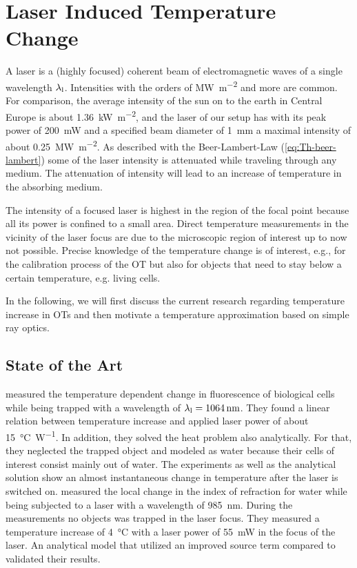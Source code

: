 \section{Laser Induced Temperature Change\label{sec:Th-temperature}}

A laser is a (highly focused) coherent beam of electromagnetic waves of a 
single wavelength $\lambda_{\mathrm{l}}$. Intensities with the orders of 
\si{\mega\watt\per\square\meter} and more are common. For comparison, the 
average intensity of the sun on to the earth in Central Europe is about 
\SI{1.36}{\kilo\watt\per\square\meter}, and the laser of our setup has with its 
peak power of \SI{200}{\milli\watt} and a specified beam diameter of 
\SI{1}{\mm} a maximal intensity of about 
\SI{0.25}{\mega\watt\per\square\meter}. As described with the Beer-Lambert-Law
(\cref{eq:Th-beer-lambert}) some of the laser intensity is attenuated while 
traveling through any medium. The attenuation of intensity will lead to an 
increase of temperature in the absorbing medium.

The intensity of a focused laser is highest in the region of the focal point 
because all its power is confined to a small area. Direct temperature 
measurements in the vicinity of the laser focus are due to the microscopic 
region of interest up to now not possible. Precise knowledge of the temperature 
change is of interest, e.g., for the calibration process of the OT but also for 
objects that need to stay below a certain temperature, e.g. living cells.

In the following, we will first discuss the current research regarding 
temperature increase in OTs and then motivate a temperature approximation based 
on simple ray optics.

\subsection{State of the Art}

 measured the temperature dependent change in fluorescence of 
biological cells while being trapped with a wavelength of 
$\lal=\SI{1064}{\nm}$. They found a linear relation between temperature 
increase and applied laser power of about \SI{15}{\degreeCelsius\per\watt}. In 
addition, they solved the heat problem also analytically. For that, they 
neglected the trapped object and modeled as water because their cells of 
interest consist mainly out of water. The experiments as well as the 
analytical solution show an almost instantaneous change in temperature after 
the laser is switched on.  measured the local change in the 
index of refraction for water while being subjected to a laser with a 
wavelength of \SI{985}{\nm}. During the measurements no objects was trapped in 
the laser focus. They measured a temperature increase of \SI{4}{\degreeCelsius} 
with a laser power of \SI{55}{\milli\watt} in the focus of the laser. An 
analytical model that utilized an improved source term compared to 
\cite{Liu1995} validated their results.

